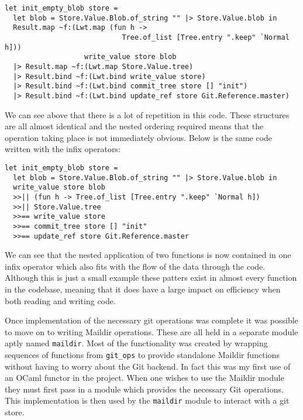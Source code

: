 \begin{verbatim}
let init_empty_blob store =
  let blob = Store.Value.Blob.of_string "" |> Store.Value.blob in
  Result.map ~f:(Lwt.map (fun h ->
                            Tree.of_list [Tree.entry ".keep" `Normal h]))
                   write_value store blob
  |> Result.map ~f:(Lwt.map Store.Value.tree)
  |> Result.bind ~f:(Lwt.bind write_value store)
  |> Result.bind ~f:(Lwt.bind commit_tree store [] "init")
  |> Result.bind ~f:(Lwt.bind update_ref store Git.Reference.master)
\end{verbatim}

We can see above that there is a lot of repetition in this code. These structures are all almost identical and the nested ordering required means that the operation taking place is not immediately obvious. Below is the same code written with the infix operators:

\begin{verbatim}
let init_empty_blob store =
  let blob = Store.Value.Blob.of_string "" |> Store.Value.blob in
  write_value store blob
  >>|| (fun h -> Tree.of_list [Tree.entry ".keep" `Normal h])
  >>|| Store.Value.tree
  >>== write_value store
  >>== commit_tree store [] "init"
  >>== update_ref store Git.Reference.master
\end{verbatim}

We can see that the nested application of two functions is now contained in one infix operator which also fits with the flow of the data through the code. Although this is just a small example these patters exist in almost every function in the codebase, meaning that it does have a large impact on efficiency when both reading and writing code.

Once implementation of the necessary git operations was complete it was possible to move on to writing Maildir operations. These are all held in a separate module aptly named \texttt{maildir}. Most of the functionality was created by wrapping sequences of functions from \texttt{git\_ops} to provide standalone Maildir functions without having to worry about the Git backend. In fact this was my first use of an OCaml functor in the project. When one wishes to use the Maildir module they must first pass in a module which provides the necessary Git operations. This implementation is then used by the \texttt{maildir} module to interact with a git store.

